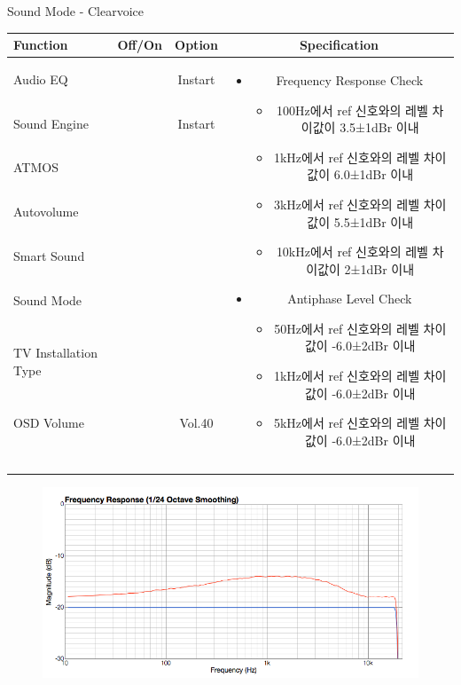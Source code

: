 \begin{frame}[t]{Sound Mode - Clearvoice}
\begin{tiny}
\begin{tabular}{@{}lccc@{}}
\toprule
Function & Off/On & Option & Specification \\
\midrule
Audio EQ & \color{black}{Off} & Instart &
\multirow{10}{60mm}{
\begin{itemize}
\item Frequency Response Check
	\begin{itemize}
	\item 100Hz에서 ref 신호와의 레벨 차이값이 3.5±1dBr 이내
	\item 1kHz에서 ref 신호와의 레벨 차이값이 6.0±1dBr 이내
	\item 3kHz에서 ref 신호와의 레벨 차이값이 5.5±1dBr 이내
	\item 10kHz에서 ref 신호와의 레벨 차이값이 2±1dBr 이내
	\end{itemize}
\item Antiphase Level Check
	\begin{itemize}
	\item 50Hz에서 ref 신호와의 레벨 차이값이 -6.0±2dBr 이내
	\item 1kHz에서 ref 신호와의 레벨 차이값이 -6.0±2dBr 이내
	\item 5kHz에서 ref 신호와의 레벨 차이값이 -6.0±2dBr 이내
	\end{itemize}
\end{itemize}
} \\
Sound Engine & \color{blue}{On} & Instart & \\
ATMOS & \color{black}{Off}  & & \\
Autovolume & \color{black}{Off} & & \\
Smart Sound & \color{black}{Off} & & \\
Sound Mode & \color{blue}{On} & \color{blue}{Clearvoice} & \\
TV Installation Type & \color{blue}{On} & \color{black}{Standtype1} & \\
OSD Volume & \color{blue}{On} & Vol.40 & \\
& & & \\
& & & \\
& & & \\
& & & \\
\midrule
\end{tabular}
\end{tiny}

\begin{figure}[b]
\includegraphics[height=0.3\textwidth]{figures/clearvoice.png}
\end{figure}

\end{frame}
